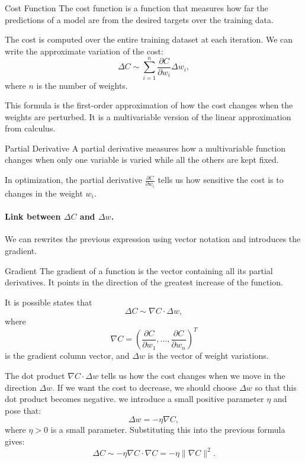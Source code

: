 \documentclass[11pt]{article}
\theoremstyle{smallexample}
\begin{document}
 \begin{defbox}{Cost Function}
 The cost function is a function that measures how far the predictions of a model are from the desired targets over the training data.
 \end{defbox}

The cost is computed over the entire training dataset at each iteration.
We can write the approximate variation of the cost:
 \[
 \Delta C \sim \sum_{i=1}^{n} \frac{\partial C}{\partial w_i}\Delta w_i ,
 \]
where \(n\) is the number of weights.

This formula is the first-order approximation of how the cost changes when the weights are perturbed. It is a multivariable version of the linear approximation from calculus.

 \begin{defbox}{Partial Derivative}
 A partial derivative measures how a multivariable function changes when only one variable is varied while all the others are kept fixed.
 \end{defbox}

In optimization, the partial derivative \( \frac{\partial C}{\partial w_i} \) tells us how sensitive the cost is to changes in the weight \(w_i\). 

\vspace{-0.2cm}

\paragraph{ Link between \(\Delta C\) and \(\Delta w\).}
We can rewrites the previous expression using vector notation and introduces the gradient.

 \begin{defbox}{Gradient}
 The gradient of a function is the vector containing all its partial derivatives. It points in the direction of the greatest increase of the function.
 \end{defbox}

It is possible states that
 \[
 \Delta C \sim \nabla C \cdot \Delta w,
 \]
where
 \[
 \nabla C =
 \left(
 \frac{\partial C}{\partial w_1},
 \ldots,
 \frac{\partial C}{\partial w_n}
 \right)^T
 \]
is the gradient column vector, and \( \Delta w \) is the vector of weight variations.

The dot product \( \nabla C \cdot \Delta w \) tells us how the cost changes when we move in the direction \( \Delta w \). If we want the cost to decrease, we should choose \( \Delta w \) so that this dot product becomes negative. we introduce a small positive parameter $\eta$ and pose that:
 \[
 \Delta w = -\eta \nabla C,
 \]
where \( \eta > 0 \) is a small parameter. Substituting this into the previous formula gives:
 \begin{equation}
 \Delta C \sim -\eta \nabla C \cdot \nabla C = -\eta \|\nabla C\|^2.
 \end{equation}
\end{document}
